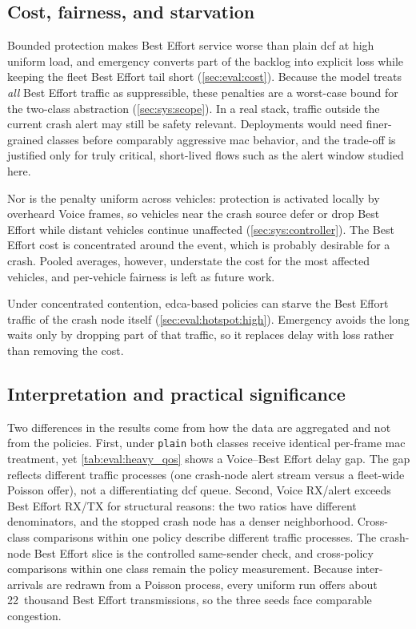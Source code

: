 \subsection{Cost, fairness, and starvation}
\label{sec:eval:disc:cost}

Bounded protection makes Best Effort service worse than plain \gls{dcf} at high uniform load, and emergency converts part of the backlog into explicit loss while keeping the fleet Best Effort tail short (\autoref{sec:eval:cost}).
Because the model treats \emph{all} Best Effort traffic as suppressible, these penalties are a worst-case bound for the two-class abstraction (\autoref{sec:sys:scope}).
In a real stack, traffic outside the current crash alert may still be safety relevant.
Deployments would need finer-grained classes before comparably aggressive \gls{mac} behavior, and the trade-off is justified only for truly critical, short-lived flows such as the alert window studied here.

\label{sec:eval:disc:spatial}
Nor is the penalty uniform across vehicles: protection is activated locally by overheard Voice frames, so vehicles near the crash source defer or drop Best Effort while distant vehicles continue unaffected (\autoref{sec:sys:controller}).
The Best Effort cost is concentrated around the event, which is probably desirable for a crash.
Pooled averages, however, understate the cost for the most affected vehicles, and per-vehicle fairness is left as future work.

\label{sec:eval:disc:starvation}
Under concentrated contention, \gls{edca}-based policies can starve the Best Effort traffic of the crash node itself (\autoref{sec:eval:hotspot:high}).
Emergency avoids the long waits only by dropping part of that traffic, so it replaces delay with loss rather than removing the cost.

\subsection{Interpretation and practical significance}
\label{sec:eval:disc:plain}

Two differences in the results come from how the data are aggregated and not from the policies.
First, under \texttt{plain} both classes receive identical per-frame \gls{mac} treatment, yet \autoref{tab:eval:heavy_qos} shows a Voice--Best Effort delay gap.
The gap reflects different traffic processes (one crash-node alert stream versus a fleet-wide Poisson offer), not a differentiating \gls{dcf} queue.
Second, Voice RX/alert exceeds Best Effort RX/TX for structural reasons: the two ratios have different denominators, and the stopped crash node has a denser neighborhood.
Cross-class comparisons within one policy describe different traffic processes.
The crash-node Best Effort slice is the controlled same-sender check, and cross-policy comparisons within one class remain the policy measurement.
Because inter-arrivals are redrawn from a Poisson process, every uniform run offers about 22~thousand Best Effort transmissions, so the three seeds face comparable congestion.

